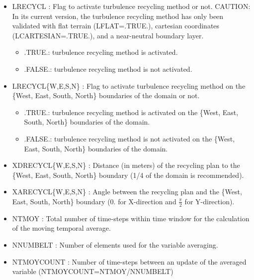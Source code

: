 \begin{itemize}
 
\item LRECYCL : Flag to
  activate turbulence recycling method or not. CAUTION: In its
  current version, the turbulence recycling method has only been validated with
  flat terrain (LFLAT=.TRUE.), cartesian coordinates
  (LCARTESIAN=.TRUE.), and a near-neutral boundary layer.
\begin{itemize}
\item .TRUE.: turbulence recycling method is activated.
\item .FALSE.: turbulence recycling method is not activated.
\end{itemize}

\item LRECYCL\{W,E,S,N\} : Flag to
  activate turbulence recycling method on the \{West, East, South, North\} boundaries of the domain or not.
\begin{itemize}
\item .TRUE.: turbulence recycling method is activated on the \{West, East, South, North\} boundaries of the domain.
\item .FALSE.: turbulence recycling method is not activated on the \{West, East, South, North\} boundaries of the domain.
\end{itemize}

\item XDRECYCL\{W,E,S,N\} : Distance (in meters) of the recycling plan to the \{West, East, South, North\} boundary (1/4 of the domain is recommended).

\item XARECYCL\{W,E,S,N\} : Angle between the recycling plan and the \{West, East, South, North\} boundary (0. for X-direction and
$\frac{\pi}{2}$ for Y-direction).

\item NTMOY : Total number of time-steps within time window
for the calculation of the moving temporal average.

\item NNUMBELT : Number of elements used for the variable averaging.

\item NTMOYCOUNT : Number of time-steps between an update of the averaged variable (NTMOYCOUNT=NTMOY/NNUMBELT)


\end{itemize}

